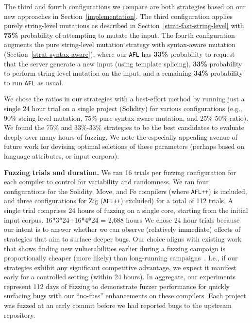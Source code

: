 The third and fourth configurations we compare are both strategies based on our
new approaches in Section~\ref{implementation}. The third configuration applies
purely string-level mutations as described in
Section~\ref{strat-fast-string-level} with \textbf{75\%} probability of
attempting to mutate the input. The fourth configuration augments the pure
string-level mutation strategy with syntax-aware mutation
(Section~\ref{strat-syntax-aware}), where our \texttt{AFL} has \textbf{33\%}
probability to request that the server generate a new input (using template
splicing), \textbf{33\%} probability to perform string-level mutation on the
input, and a remaining \textbf{34\%} probability to run \texttt{AFL} as usual.

We chose the ratios in our strategies with a best-effort method by running just
a single 24 hour trial on a single project (Solidity) for various
configurations (e.g., 90\% string-level mutation, 75\% pure syntax-aware
mutation, and 25\%-50\% ratio). We found the 75\% and 33\%-33\% strategies
to be the best candidates to evaluate deeply over many hours of fuzzing. We
note the especially appealing avenue of future work for devising optimal
seletions of these parameters (perhaps based on language attributes, or input
corpora).

\noindent \textbf{Fuzzing trials and duration.} We ran 16 trials per fuzzing
configuration for each compiler to control for variability and randomness.  We
ran four configurations for the Solidity, Move, and Fe compilers (where
\texttt{AFL++}) is included, and three configurations for Zig (\texttt{AFL++})
excluded) for a total of 112 trials.  A single trial comprises 24 hours of
fuzzing on a single core, starting from the initial input corpus.  %
16*3*24+16*4*24 = 2,688 hours We chose 24 hour trials because our intent is to
answer whether we can observe (relatively immediate) effects of strategies that
aim to surface deeper bugs.  Our choice aligns with existing work that shows
finding new vulnerabilities earlier during a fuzzing campaign is proportionally
cheaper (more likely) than long-running campaigns~\cite{fuzzexp}. I.e., if our
strategies exhibit any significant competitive advantage, we expect it manifest
early for a controlled setting (within 24 hours).  In aggregate, our
experiments represent 112 days of fuzzing to demonstrate fuzzer performance for
quickly surfacing bugs with our ``no-fuss'' enhancements on these compilers.
Each project was fuzzed at an early commit before we had reported bugs to the
upstream repository.

